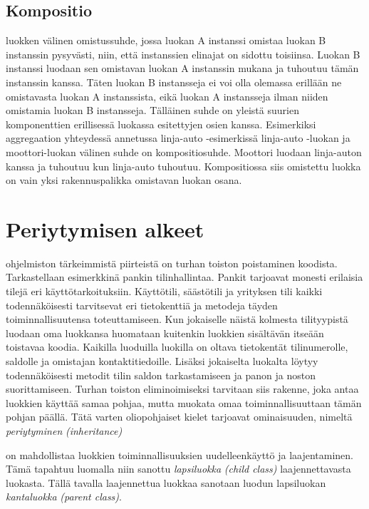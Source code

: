 \documentclass{tufte-book}
\newcommand{\eng}[1]{\textit{(#1)}}
\newcommand{\new}[1]{\textit{\gls{#1}}}
\newcommand{\neweng}[2]{\new{#1} \eng{#2}}
\begin{document}
\subsection{Kompositio}
\label{kompositio}

 luokken välinen omistussuhde, jossa luokan A instanssi omistaa
luokan B instanssin pysyvästi, niin, että instanssien elinajat on sidottu toisiinsa. Luokan B
instanssi luodaan sen omistavan luokan A instanssin mukana ja tuhoutuu tämän instanssin kanssa.
Täten luokan B instansseja ei voi olla olemassa erillään ne omistavasta luokan A instanssista,
eikä luokan A instansseja ilman niiden omistamia luokan B instansseja. Tälläinen suhde on yleistä
suurien komponenttien erillisessä luokassa esitettyjen osien kanssa. Esimerkiksi aggregaation
yhteydessä annetussa linja-auto -esimerkissä linja-auto -luokan ja moottori-luokan välinen suhde
on kompositiosuhde. Moottori luodaan linja-auton kanssa ja tuhoutuu kun linja-auto tuhoutuu.
Kompositiossa siis omistettu luokka on vain yksi rakennuspalikka omistavan luokan osana.


\section{Periytymisen alkeet}
\label{periytyminen1}

 ohjelmiston tärkeimmistä piirteistä on turhan toiston poistaminen
koodista. Tarkastellaan esimerkkinä pankin tilinhallintaa. Pankit tarjoavat monesti erilaisia
tilejä eri käyttötarkoituksiin. Käyttötili, säästötili ja yrityksen tili kaikki todennäköisesti
tarvitsevat eri tietokenttiä ja metodeja täyden toiminnallisuutensa toteuttamiseen. Kun jokaiselle
näistä kolmesta tilityypistä luodaan oma luokkansa huomataan kuitenkin luokkien sisältävän
itseään toistavaa koodia. Kaikilla luoduilla luokilla on oltava tietokentät tilinumerolle,
saldolle ja omistajan kontaktitiedoille. Lisäksi jokaiselta luokalta löytyy todennäköisesti
metodit tilin saldon tarkastamiseen ja panon ja noston suorittamiseen. Turhan toiston
eliminoimiseksi tarvitaan siis rakenne, joka antaa luokkien käyttää samaa pohjaa, mutta muokata
omaa toiminnallisuuttaan tämän pohjan päällä. Tätä varten oliopohjaiset kielet tarjoavat
ominaisuuden, nimeltä \neweng{periytyminen}{inheritance}

 on mahdollistaa luokkien toiminnallisuuksien uudelleenkäyttö
ja laajentaminen. Tämä tapahtuu luomalla niin sanottu \neweng{lapsiluokka}{child class}
laajennettavasta luokasta. Tällä tavalla laajennettua luokkaa sanotaan luodun lapsiluokan
\neweng{kantaluokka}{parent class}.
\end{document}
